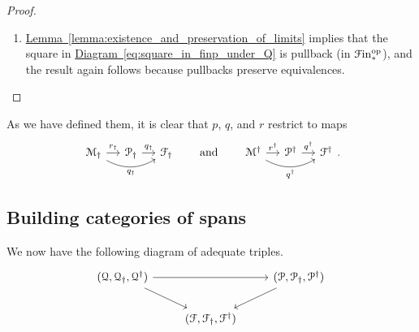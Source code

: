 \documentclass[main.tex]{subfiles}
\begin{document}
\begin{proof}
\begin{enumerate}
\begin{enumerate}
        \item \hyperref[lemma:existence_and_preservation_of_limits]{Lemma~\ref*{lemma:existence_and_preservation_of_limits}} implies that the square in \hyperref[eq:square_in_finp_under_Q]{Diagram~\ref*{eq:square_in_finp_under_Q}} is pullback (in $\mathcal{F}\mathrm{in}_{*}^{\mathrm{op}}$), and the result again follows because pullbacks preserve equivalences.
      \end{enumerate}
  \end{enumerate}
\end{proof}

As we have defined them, it is clear that $p$, $q$, and $r$ restrict to maps
\begin{equation*}
  \begin{tikzcd}[column sep=small]
    \mathcal{M}_{\dagger}
    \arrow[r, "r_{\dagger}"]
    \arrow[rr, swap,  bend right, "q_{\dagger}"]
    & \mathcal{P}_{\dagger}
    \arrow[r, "q_{\dagger}"]
    & \mathcal{F}_{\dagger}
  \end{tikzcd}
  \qquad\text{and}\qquad
  \begin{tikzcd}[column sep=small]
    \mathcal{M}^{\dagger}
    \arrow[r, "r^{\dagger}"]
    \arrow[rr, swap,  bend right, "q^{\dagger}"]
    & \mathcal{P}^{\dagger}
    \arrow[r, "q^{\dagger}"]
    & \mathcal{F}^{\dagger}
  \end{tikzcd}.
\end{equation*}


\subsection{Building categories of spans}
\label{ssc:building_categories_of_spans}

We now have the following diagram of adequate triples.
\begin{equation*}
  \begin{tikzcd}
    \triple{Q}
    \arrow[rr]
    \arrow[dr]
    && \triple{P}
    \arrow[dl]
    \\
    & \triple{F}
  \end{tikzcd}
\end{equation*}
\end{document}

